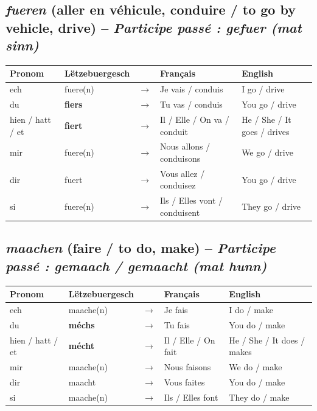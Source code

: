 \subsection{\textit{fueren} (aller en véhicule, conduire / to go by vehicle, drive) -- \textit{Participe passé : gefuer (mat sinn)}}
\begin{center}
    \begin{tabular}{ll c l l}
        \toprule
        \textbf{Pronom} & \textbf{Lëtzebuergesch} & & \textbf{Français} & \textbf{English} \\
        \midrule
        ech & fuere(n) & $\rightarrow$ & Je vais / conduis & I go / drive \\
        du & \textbf{fiers} & $\rightarrow$ & Tu vas / conduis & You go / drive \\
        hien / hatt / et & \textbf{fiert} & $\rightarrow$ & Il / Elle / On va / conduit & He / She / It goes / drives \\
        \midrule
        mir & fuere(n) & $\rightarrow$ & Nous allons / conduisons & We go / drive \\
        dir & fuert & $\rightarrow$ & Vous allez / conduisez & You go / drive \\
        si & fuere(n) & $\rightarrow$ & Ils / Elles vont / conduisent & They go / drive \\
        \bottomrule
    \end{tabular}
\end{center}

\subsection{\textit{maachen} (faire / to do, make) -- \textit{Participe passé : gemaach / gemaacht (mat hunn)}}
\begin{center}
    \begin{tabular}{ll c l l}
        \toprule
        \textbf{Pronom} & \textbf{Lëtzebuergesch} & & \textbf{Français} & \textbf{English} \\
        \midrule
        ech & maache(n) & $\rightarrow$ & Je fais & I do / make \\
        du & \textbf{méchs} & $\rightarrow$ & Tu fais & You do / make \\
        hien / hatt / et & \textbf{mécht} & $\rightarrow$ & Il / Elle / On fait & He / She / It does / makes \\
        \midrule
        mir & maache(n) & $\rightarrow$ & Nous faisons & We do / make \\
        dir & maacht & $\rightarrow$ & Vous faites & You do / make \\
        si & maache(n) & $\rightarrow$ & Ils / Elles font & They do / make \\
        \bottomrule
    \end{tabular}
\end{center}


